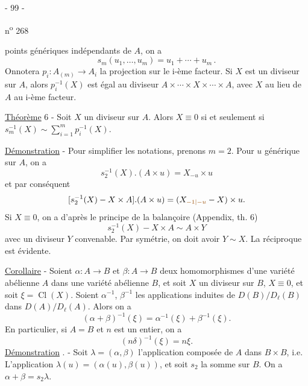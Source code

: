 \begin{center}- 99 -\end{center}\hfill n\textsuperscript{o} 268

points génériques indépendants de $A$, on a
\[
s_m(u_1,\ldots,u_m)=u_1+\cdots+u_m\,.
\]
Onnotera $p_i:A_{(m)}\longrightarrow A_i$ la projection sur le i-ème facteur. Si $X$ est un diviseur sur $A$, alors $p_i^{-1}(X)$ est égal au diviseur $A\times\cdots\times X\times\cdots\times A$, avec $X$ au lieu de $A$ au i-ème facteur.

\uline{Théorème} 6 - Soit $X$ un diviseur sur $A$. Alors $X\equiv0$ si et seulement si $s_m^{-1}(X)\sim\sum_{i=1}^m p_i^{-1}(X)$.

\uline{Démonstration} - Pour simplifier les notations, prenons $m=2$. Pour $u$ générique sur $A$, on a
\[
s_2^{-1}(X).(A\times u)=X_{-u}\times u
\]
et par conséquent
\[
[s_2^{-1}(X)-X\times A].(A\times u)=(X_{\unsure{-1|-u}}-X)\times u.
\]
Si $X\equiv0$, on a d'après le principe de la balançoire (Appendix, th. 6)
\[
s_2^{-1}(X)-X\times A\sim A\times Y
\]
avec un diviseur $Y$ convenable. Par symétrie, on doit avoir $Y\sim X$. La réciproque est évidente.

\uline{Corollaire} - Soient $\alpha:A\longrightarrow B$ et $\beta:A\longrightarrow B$ deux homomorphismes d'une variété abélienne $A$ dans une variété abélienne $B$, et soit $X$ un diviseur sur $B$, $X\equiv0$, et soit $\xi=\operatorname{Cl}(X)$. Soient $\alpha^{-1}$, $\beta^{-1}$ les applications induites de $D(B)/D_\ell(B)$ dans $D(A)/D_\ell(A)$. Alors on a
\[
(\alpha+\beta)^{-1}(\xi)=\alpha^{-1}(\xi)+\beta^{-1}(\xi).
\]
En particulier, si $A=B$ et $n$ est un entier, on a
\[
(n\delta)^{-1}(\xi)=n\xi.
\]
\uline{Démonstration} . - Soit $\lambda=(\alpha,\beta)$ l'application composée de $A$ dans $B\times B$, i.e. L'application $\lambda(u)=(\alpha(u),\beta(u))$, et soit $s_2$ la somme sur $B$. On a $\alpha+\beta=s_2\lambda$.
